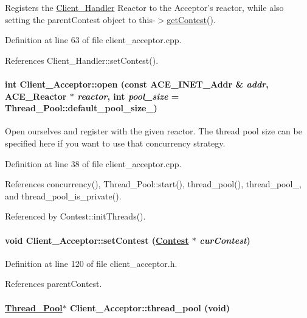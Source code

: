 Registers the \hyperlink{classClient__Handler}{Client\_\-Handler} Reactor to the Acceptor's reactor, while also setting the parent\-Contest object to this-$>$\hyperlink{classClient__Acceptor_Client__Acceptora10}{get\-Contest()}. 

Definition at line 63 of file client\_\-acceptor.cpp.

References Client\_\-Handler::set\-Contest().\hypertarget{classClient__Acceptor_Client__Acceptora3}{
\paragraph[open]{\setlength{\rightskip}{0pt plus 5cm}int Client\_\-Acceptor::open (const ACE\_\-INET\_\-Addr \& {\em addr}, ACE\_\-Reactor $\ast$ {\em reactor}, int {\em pool\_\-size} = Thread\_\-Pool::default\_\-pool\_\-size\_\-)}\hfill}
\label{classClient__Acceptor_Client__Acceptora3}


Open ourselves and register with the given reactor. The thread pool size can be specified here if you want to use that concurrency strategy. 

Definition at line 38 of file client\_\-acceptor.cpp.

References concurrency(), Thread\_\-Pool::start(), thread\_\-pool(), thread\_\-pool\_\-, and thread\_\-pool\_\-is\_\-private().

Referenced by Contest::init\-Threads().\hypertarget{classClient__Acceptor_Client__Acceptora9}{
\paragraph[setContest]{\setlength{\rightskip}{0pt plus 5cm}void Client\_\-Acceptor::set\-Contest (\hyperlink{classContest}{Contest} $\ast$ {\em cur\-Contest})}\hfill}
\label{classClient__Acceptor_Client__Acceptora9}




Definition at line 120 of file client\_\-acceptor.h.

References parent\-Contest.\hypertarget{classClient__Acceptor_Client__Acceptora6}{
\paragraph[thread\_\-pool]{\setlength{\rightskip}{0pt plus 5cm}\hyperlink{classThread__Pool}{Thread\_\-Pool}$\ast$ Client\_\-Acceptor::thread\_\-pool (void)}\hfill}
\label{classClient__Acceptor_Client__Acceptora6}


